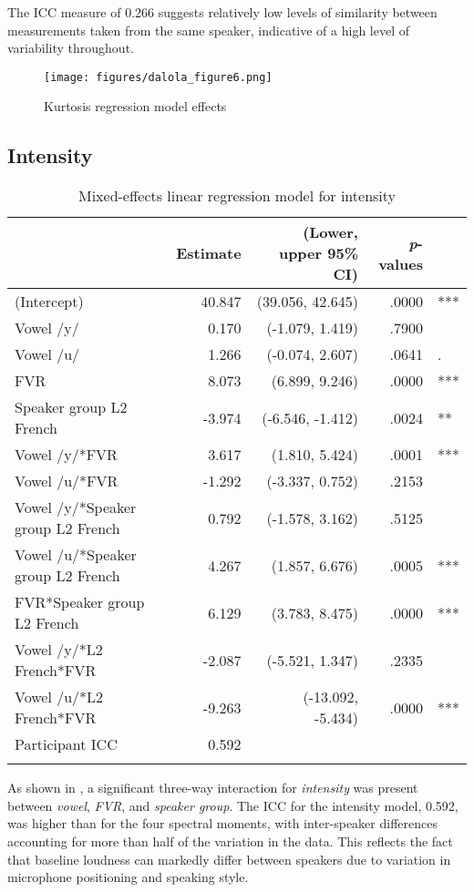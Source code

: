 \documentclass[output=paper,colorlinks,citecolor=brown,draftmode]{langscibook}
\begin{document}
\largerpage
The ICC measure of 0.266 suggests relatively low levels of similarity between measurements taken from the same speaker, indicative of a high level of variability throughout.

\begin{figure}
    \texttt{[image: figures/dalola\_figure6.png]}
    \caption{Kurtosis regression model effects}
    \label{figure6}
\end{figure}

\subsection{Intensity}
\begin{table}
\caption{Mixed-effects linear regression model for intensity}
\small
\begin{tabularx}{\textwidth}{Qrrrl}
 \lsptoprule
   & \textbf{Estimate} & \textbf{(Lower, upper 95\% CI)} & \textbf{\emph{p}-values} &  \\ [0.5ex]
 \midrule
 (Intercept) & 40.847 & (39.056, 42.645) & .0000 & *** \\
 Vowel /y/ & 0.170 & (-1.079, 1.419) & .7900 & \\
 Vowel /u/ & 1.266 & (-0.074, 2.607) & .0641 & . \\
 FVR & 8.073 & (6.899, 9.246) & .0000 & *** \\
 Speaker group L2 French & -3.974 & (-6.546, -1.412) & .0024 & ** \\
 Vowel /y/*FVR & 3.617 & (1.810, 5.424) & .0001 & *** \\
 Vowel /u/*FVR & -1.292 & (-3.337, 0.752) & .2153 & \\
 Vowel /y/*Speaker group L2 French & 0.792 & (-1.578, 3.162) & .5125 & \\
 Vowel /u/*Speaker group L2 French & 4.267 & (1.857, 6.676) & .0005 & *** \\
 FVR*Speaker group L2 French & 6.129 & (3.783, 8.475) & .0000 & *** \\
 Vowel /y/*L2 French*FVR & -2.087 & (-5.521, 1.347) & .2335 & \\
 Vowel /u/*L2 French*FVR & -9.263 & (-13.092, -5.434) & .0000 & *** \\
 \midrule
Participant ICC  & 0.592 & \\
\lspbottomrule
\end{tabularx}
\label{table:6}
\end{table}

As shown in , a significant three-way interaction for \emph{intensity} was present between \emph{vowel}, \emph{FVR}, and \emph{speaker group}. The ICC for the intensity model, 0.592, was higher than for the four spectral moments, with inter-speaker differences accounting for more than half of the variation in the data. This reflects the fact that baseline loudness can markedly differ between speakers due to variation in microphone positioning and speaking style.
\end{document}
